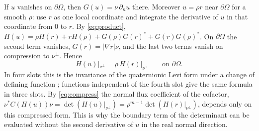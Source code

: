 If $u$ vanishes on $\partial\Omega$, then $G(u)=\nu\,\partial_nu$ there. Moreover $u=\rho r$ near
$\partial\Omega$ for a smooth $\rho$: use $r$ as one local coordinate and integrate the
derivative of $u$ in that coordinate from $0$ to $r$. By \eqref{eq:product},
$H(u)=\rho H(r)+rH(\rho)+G(\rho)G(r)^*+G(r)G(\rho)^*$. On $\partial\Omega$ the second term vanishes,
$G(r)=|\nabla r|\nu$, and the last two terms vanish on compression to $\nu^\perp$. Hence
\begin{equation}\label{eq:levi}
H(u)|_{\nu^\perp}=\rho\,H(r)|_{\nu^\perp}\qquad\text{on }\partial\Omega .
\end{equation}
In four slots this is the invariance of the quaternionic Levi form under a change of defining
function \cite{Ale03b}; functions independent of the fourth slot give the same formula in three
slots. By \eqref{eq:compress} the normal flux coefficient of the cofactor,
$\nu^*C(H(u))\nu=\det(H(u)|_{\nu^\perp})=\rho^{m-1}\det(H(r)|_{\nu^\perp})$, depends only on
this compressed form. This is why the boundary term of the determinant can be evaluated
without the second derivative of $u$ in the real normal direction.
